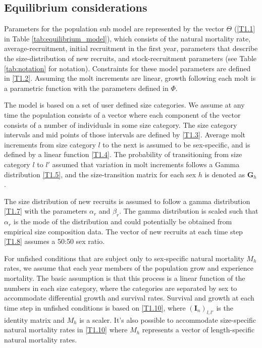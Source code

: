 \documentclass[12pt,letterpaper]{article}
\begin{document}
    \subsection*{Equilibrium considerations} %
    \label{sub:equilibrium_considerations}
    Parameters for the population sub model are represented by the vector $\Theta$ (\ref{T1.1} in Table \ref{tab:equilibrium_model}), which consists of the natural mortality rate, average-recruitment, initial recruitment in the first year, parameters that describe the size-distribution of new recruits, and stock-recruitment parameters (see Table \ref{tab:notation} for notation).  Constraints for these model parameters are defined in \eqref{T1.2}.  Assuming the molt increments are linear, growth following each molt is a parametric function with the parameters defined in $\Phi$.

    The model is based on a set of user defined size categories. We assume at any time the population consists of a vector where each component of the vector consists of a number of individuals in some size category. The size category intervals and mid points of those intervals are defined by \eqref{T1.3}.  Average molt increments from size category $l$ to the next is assumed to be sex-specific, and is defined by a linear function \eqref{T1.4}.  The probability of transitioning from  size category $l$ to $l'$ assumed that variation in molt increments follows a Gamma distribution \eqref{T1.5}, and the size-transition matrix for each sex $h$ is denoted as $\pmb{G}_h$.  

    The size distribution of new recruits is assumed to follow a gamma distribution \eqref{T1.7} with the parameters $\alpha_r$ and $\beta_r$.  The gamma distribution is scaled such that $\alpha_r$ is the mode of the distribution and could potentially be obtained from empirical size composition data.  The vector of new recruits at each time step \eqref{T1.8} assumes a 50:50 sex ratio.

    For unfished conditions that are subject only to sex-specific natural mortality $M_h$ rates, we assume that each year members of the population grow and experience mortality.  The basic assumption is that this process is a linear function of the numbers in each size category, where the categories are separated by  sex to accommodate differential growth and survival rates.  Survival and growth at each time step in unfished conditions is based on \eqref{T1.10}, where $(\pmb{I}_n)_{l,l'}$ is the identity matrix and $M_h$ is a scaler. It's also possible to accommodate size-specific natural mortality rates in \eqref{T1.10} where $M_h$ represents a vector of length-specific natural mortality rates.    
\end{document}
